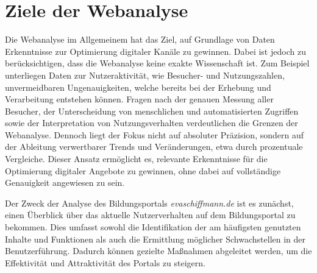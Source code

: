 \section{Ziele der Webanalyse} %
Die Webanalyse im Allgemeinem hat das Ziel, auf Grundlage von Daten Erkenntnisse zur Optimierung digitaler Kanäle zu gewinnen. Dabei ist jedoch zu berücksichtigen, dass die Webanalyse keine exakte Wissenschaft ist. Zum Beispiel unterliegen Daten zur Nutzeraktivität, wie Besucher- und Nutzungszahlen, unvermeidbaren Ungenauigkeiten, welche bereits bei der Erhebung und Verarbeitung entstehen können. Fragen nach der genauen Messung aller Besucher, der Unterscheidung von menschlichen und automatisierten Zugriffen sowie der Interpretation von Nutzungsverhalten verdeutlichen die Grenzen der Webanalyse. Dennoch liegt der Fokus nicht auf absoluter Präzision, sondern auf der Ableitung verwertbarer Trends und Veränderungen, etwa durch prozentuale Vergleiche. Dieser Ansatz ermöglicht es, relevante Erkenntnisse für die Optimierung digitaler Angebote zu gewinnen, ohne dabei auf vollständige Genauigkeit angewiesen zu sein. \parencite[Kap.1.4]{Hassler2019}

Der Zweck der Analyse des Bildungsportals \textit{evaschiffmann.de} ist es zunächst, einen Überblick über das aktuelle Nutzerverhalten auf dem Bildungsportal zu bekommen. Dies umfasst sowohl die Identifikation der am häufigsten genutzten Inhalte und Funktionen als auch die Ermittlung möglicher Schwachstellen in der Benutzerführung. Dadurch können gezielte Maßnahmen abgeleitet werden, um die Effektivität und Attraktivität des Portals zu steigern. 


